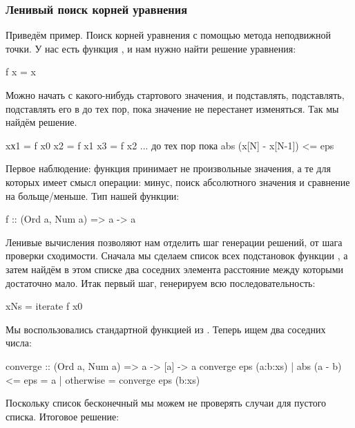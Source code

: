 \subsubsection{Ленивый поиск корней уравнения}

Приведём пример. Поиск корней уравнения с помощью метода
неподвижной точки.
У нас есть функция , и нам нужно найти 
решение уравнения:

\begin{code}
f x = x
\end{code}

Можно начать с какого-нибудь стартового значения, и подставлять,
подставлять, подставлять его в  до тех пор, пока значение
не перестанет изменяться. Так мы найдём решение. 

\begin{code}
xх1 = f x0
x2 = f x1
x3 = f x2
...
до тех пор пока abs (x[N] - x[N-1]) <= eps
\end{code}

Первое наблюдение: функция принимает не произвольные значения,
а те для которых имеет смысл операции: минус, поиск абсолютного
значения и сравнение на больще/меньше. Тип нашей функции:

\begin{code}
f :: (Ord a, Num a) => a -> a
\end{code}

Ленивые вычисления позволяют нам отделить шаг генерации
решений, от шага проверки сходимости. Сначала мы сделаем
список всех подстановок функции , а затем найдём
в этом списке два соседних элемента расстояние между которыми 
достаточно мало. Итак первый шаг, генерируем всю
последовательность:

\begin{code}
xNs = iterate f x0
\end{code}

Мы воспользовались стандартной функцией  из
. Теперь ищем два соседних числа:


\begin{code}
converge :: (Ord a, Num a) => a -> [a] -> a
converge eps (a:b:xs) 
    | abs (a - b) <= eps    = a
    | otherwise             = converge eps (b:xs)
\end{code}

Поскольку список бесконечный мы можем не проверять
случаи для пустого списка. Итоговое решение:


